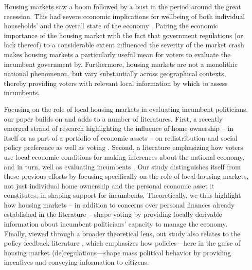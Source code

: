 \documentclass[12pt,a4paper]{article}
\begin{document}
Housing markets saw a boom followed by a bust in the period around the great recession. This had severe economic implications for wellbeing of both individual households’ and the overall state of the economy \citep{dam2011housing,ansell2014political}. Pairing the economic importance of the housing market with the fact that government regulations (or lack thereof) to a considerable extent influenced the severity of the market crash makes housing markets a particularly useful mean for voters to evaluate the incumbent government by. Furthermore, housing markets are not a monolithic national phenomenon, but vary substantially across geographical contexts, thereby providing voters with relevant local information by which to assess incumbents. 

Focusing on the role of local housing markets in evaluating incumbent politicians, our paper builds on and adds to a number of literatures. First, a recently emerged strand of research highlighting the influence of home ownership -- in itself or as part of a portfolio of economic assets -- on redistribution and social policy preference as well as voting \citep{ansell2014political,nadeau2010patrimonial,stubager2013reaching}. Second, a literature emphasizing how voters use local economic conditions for making inferences about the national economy, and in turn, well as evaluating incumbents \citep{anderson2011local,reeves2012ecologies,healy2014presidential,ansolabehere2014mecro,bisgaard2016reconsidering}. Our study distinguishes itself from these previous efforts by focusing specifically on the role of local housing markets, not just individual home ownership and the personal economic asset it constitutes, in shaping support for incumbents. Theoretically, we thus highlight how housing markets -- in addition to concerns over personal finances already established in the literature -- shape voting by providing locally derivable information about incumbent politicians’ capacity to manage the economy. Finally, viewed through a broader theoretical lens, out study also relates to the policy feedback literature \citep{pierson1993effect}, which emphasizes how policies—here in the guise of housing market (de)regulations—shape mass political behavior by providing incentives and conveying information to citizens.
\end{document}
